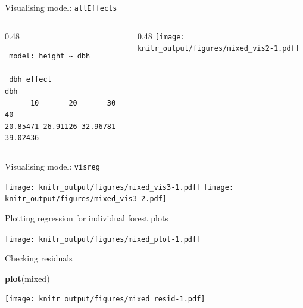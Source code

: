 \documentclass[10pt,ignorenonframetext,]{beamer}
\newenvironment{Shaded}{\begin{snugshade}}{\end{snugshade}}
\newcommand{\KeywordTok}[1]{\textcolor[rgb]{0.13,0.29,0.53}{\textbf{{#1}}}}
\newcommand{\DataTypeTok}[1]{\textcolor[rgb]{0.13,0.29,0.53}{{#1}}}
\newcommand{\DecValTok}[1]{\textcolor[rgb]{0.00,0.00,0.81}{{#1}}}
\newcommand{\StringTok}[1]{\textcolor[rgb]{0.31,0.60,0.02}{{#1}}}
\newcommand{\NormalTok}[1]{{#1}}
\def\begincols{\begin{columns}[c]}
\def\endcols{\end{columns}}
\def\begincol{\begin{column}{0.48\textwidth}}
\def\endcol{\end{column}}
\begin{document}
\begin{frame}[fragile]{Visualising model: \texttt{allEffects}}

\begincols
\begincol

\begin{verbatim}
 model: height ~ dbh

 dbh effect
dbh
      10       20       30       40 
20.85471 26.91126 32.96781 39.02436 
\end{verbatim}

\endcol

\begincol
\texttt{[image: knitr\_output/figures/mixed\_vis2-1.pdf]} \endcol
\endcols

\end{frame}

\begin{frame}{Visualising model: \texttt{visreg}}

\texttt{[image: knitr\_output/figures/mixed\_vis3-1.pdf]}
\texttt{[image: knitr\_output/figures/mixed\_vis3-2.pdf]}

\end{frame}

\begin{frame}[fragile]{Plotting regression for individual forest plots}

\begin{Shaded}
\end{Shaded}

\texttt{[image: knitr\_output/figures/mixed\_plot-1.pdf]}

\end{frame}

\begin{frame}[fragile]{Checking residuals}

\begin{Shaded}
\begin{Highlighting}[]
\KeywordTok{plot}\NormalTok{(mixed)}
\end{Highlighting}
\end{Shaded}

\texttt{[image: knitr\_output/figures/mixed\_resid-1.pdf]}

\end{frame}
\end{document}

